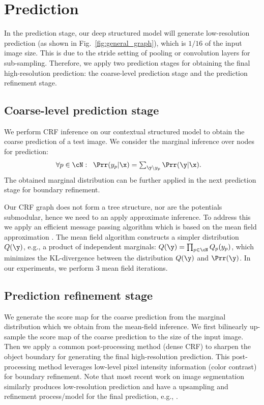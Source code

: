 \section{Prediction}
\label{sec:prediction}

In the prediction stage,
our deep structured model will generate low-resolution prediction (as shown in Fig.~\ref{fig:general_graph}), 
which is $1/16$ of the input image size.
This is due to the stride setting of pooling or convolution layers for sub-sampling.
Therefore, we apply two prediction stages for obtaining the final high-resolution prediction: 
the coarse-level prediction stage and the prediction refinement stage.


\subsection{Coarse-level prediction stage}
We perform CRF inference on our contextual structured model to obtain the coarse prediction of a test image.
We consider the marginal inference over nodes for prediction:
\begin{align} \label{eq:inference}
\forall p \in \cN: \;\; \Prr(y_p|\x)&= {\textstyle \sum_{\y \backslash y_p } \Prr(\y|\x)}.
\end{align}
The obtained marginal distribution can be further applied in the next prediction stage for boundary refinement.

Our CRF graph does not form a tree structure,
nor are the potentials submodular,
hence we need to an apply approximate inference.
To address this we
apply an efficient  message passing algorithm which is based on the mean field approximation \cite{Nowozinstruct}.
The mean field algorithm constructs a simpler distribution $Q(\y)$, e.g.,
a product of independent marginals: 
$Q(\y)=\prod_{p \in \cN} Q_p (y_p)$, 
which minimizes the KL-divergence between the distribution $Q(\y)$ and $\Prr(\y)$.
In our experiments, we perform $3$ mean field iterations.


\subsection{Prediction refinement stage}
We generate the score map for the coarse prediction from the marginal distribution which we obtain from the mean-field inference.
We first bilinearly up-sample the score map of the coarse prediction to the size of the input image.
Then we apply a common post-processing method \cite{krahenbuhl2012efficient} (dense CRF)
to sharpen the object boundary for generating the final high-resolution prediction.
This post-processing method leverages low-level pixel intensity information (color contrast) for boundary refinement. 
Note that most recent work on image segmentation similarly produces low-resolution prediction
 and have a upsampling and refinement process/model for the final prediction, e.g., 
\cite{ChenPKMY14,zheng2015conditional,Dai2015arXiv}.

